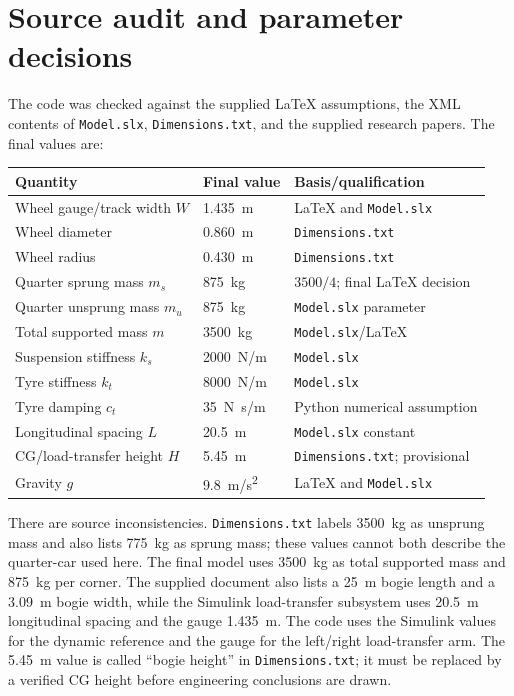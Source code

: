 \documentclass[11pt,a4paper]{article}
\begin{document}
\section{Source audit and parameter decisions}
The code was checked against the supplied LaTeX assumptions, the XML contents of \texttt{Model.slx}, \texttt{Dimensions.txt}, and the supplied research papers. The final values are:
\begin{center}
\begin{tabular}{lll}
\toprule
Quantity & Final value & Basis/qualification\\
\midrule
Wheel gauge/track width $W$ & \SI{1.435}{m} & LaTeX and \texttt{Model.slx}\\
Wheel diameter & \SI{0.860}{m} & \texttt{Dimensions.txt}\\
Wheel radius & \SI{0.430}{m} & \texttt{Dimensions.txt}\\
Quarter sprung mass $m_s$ & \SI{875}{kg} & $3500/4$; final LaTeX decision\\
Quarter unsprung mass $m_u$ & \SI{875}{kg} & \texttt{Model.slx} parameter\\
Total supported mass $m$ & \SI{3500}{kg} & \texttt{Model.slx}/LaTeX\\
Suspension stiffness $k_s$ & \SI{2000}{N/m} & \texttt{Model.slx}\\
Tyre stiffness $k_t$ & \SI{8000}{N/m} & \texttt{Model.slx}\\
Tyre damping $c_t$ & \SI{35}{N.s/m} & Python numerical assumption\\
Longitudinal spacing $L$ & \SI{20.5}{m} & \texttt{Model.slx} constant\\
CG/load-transfer height $H$ & \SI{5.45}{m} & \texttt{Dimensions.txt}; provisional\\
Gravity $g$ & \SI{9.8}{m/s^2} & LaTeX and \texttt{Model.slx}\\
\bottomrule
\end{tabular}
\end{center}

There are source inconsistencies. \texttt{Dimensions.txt} labels \SI{3500}{kg} as unsprung mass and also lists \SI{775}{kg} as sprung mass; these values cannot both describe the quarter-car used here. The final model uses \SI{3500}{kg} as total supported mass and \SI{875}{kg} per corner. The supplied document also lists a \SI{25}{m} bogie length and a \SI{3.09}{m} bogie width, while the Simulink load-transfer subsystem uses \SI{20.5}{m} longitudinal spacing and the gauge \SI{1.435}{m}. The code uses the Simulink values for the dynamic reference and the gauge for the left/right load-transfer arm. The \SI{5.45}{m} value is called ``bogie height'' in \texttt{Dimensions.txt}; it must be replaced by a verified CG height before engineering conclusions are drawn.
\end{document}
